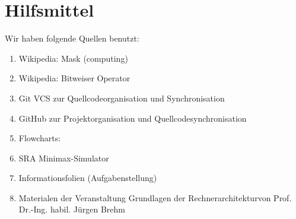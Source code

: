 \documentclass[12pt,titlepage]{article}
\begin{document}
\newpage



\section{Hilfsmittel}
Wir haben folgende Quellen benutzt:
\begin{enumerate} 
\item Wikipedia: \dq Mask (computing)\dq \\ 
\item Wikipedia: \dq Bitweiser Operator\dq \\ 
\item Git VCS zur Quellcodeorganisation und Synchronisation
\item GitHub zur Projektorganisation und Quellcodesynchronisation
\item Flowcharts: 
\item SRA Minimax-Simulator
\item Informationsfolien (Aufgabenstellung)
\item Materialen der Veranstaltung \dq Grundlagen der Rechnerarchitektur\dq von Prof. Dr.-Ing. habil. Jürgen Brehm
\end{enumerate}
\end{document}
